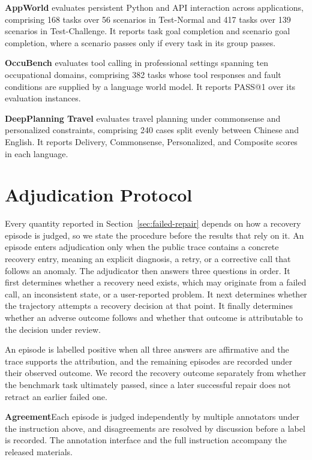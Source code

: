 \documentclass{article}
\begin{document}
\textbf{AppWorld} \citep{trivedi2024appworld} evaluates persistent Python and API interaction across applications, comprising 168 tasks over 56 scenarios in Test-Normal and 417 tasks over 139 scenarios in Test-Challenge. It reports task goal completion and scenario goal completion, where a scenario passes only if every task in its group passes.

\textbf{OccuBench} evaluates tool calling in professional settings spanning ten occupational domains, comprising 382 tasks whose tool responses and fault conditions are supplied by a language world model. It reports PASS@1 over its evaluation instances.

\textbf{DeepPlanning Travel} evaluates travel planning under commonsense and personalized constraints, comprising 240 cases split evenly between Chinese and English. It reports Delivery, Commonsense, Personalized, and Composite scores in each language.

\section{Adjudication Protocol}
\label{app:adjudication}
Every quantity reported in Section~\ref{sec:failed-repair} depends on how a recovery episode is judged, so we state the procedure before the results that rely on it. An episode enters adjudication only when the public trace contains a concrete recovery entry, meaning an explicit diagnosis, a retry, or a corrective call that follows an anomaly. The adjudicator then answers three questions in order. It first determines whether a recovery need exists, which may originate from a failed call, an inconsistent state, or a user-reported problem. It next determines whether the trajectory attempts a recovery decision at that point. It finally determines whether an adverse outcome follows and whether that outcome is attributable to the decision under review.

An episode is labelled positive when all three answers are affirmative and the trace supports the attribution, and the remaining episodes are recorded under their observed outcome. We record the recovery outcome separately from whether the benchmark task ultimately passed, since a later successful repair does not retract an earlier failed one.

\textbf{Agreement}\quad Each episode is judged independently by multiple annotators under the instruction above, and disagreements are resolved by discussion before a label is recorded. The annotation interface and the full instruction accompany the released materials.
\end{document}

